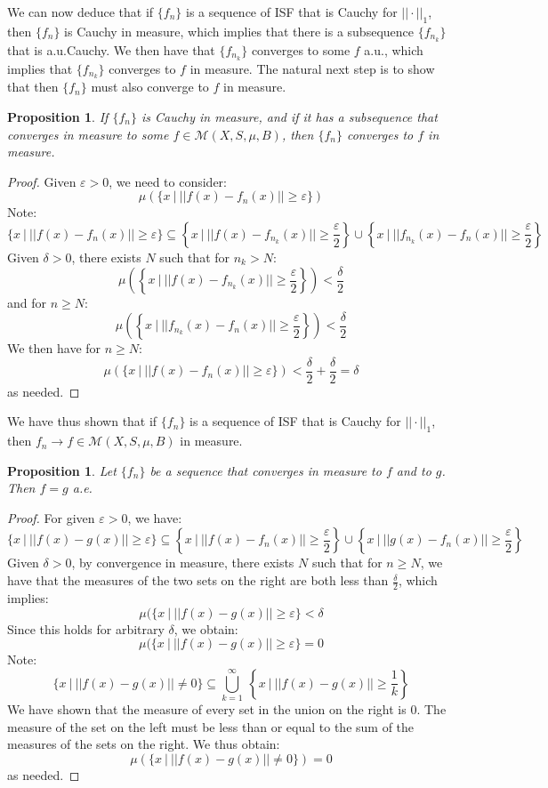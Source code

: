 \documentclass[a4paper,12pt]{report}
\newcommand{\ms}[1]{\mathscr{#1}}
\newcommand{\varep}{ \varepsilon }
\newcommand{\sse} {\subseteq}
\newtheorem{prop}[theorem]{Proposition}
\begin{document}
	\noindent We can now deduce that if $\{f_n\}$ is a sequence of ISF that is Cauchy for $||\cdot||_1$, then $\{f_n\}$ is Cauchy in measure, which implies that there is a subsequence $\{f_{n_k}\}$ that is a.u.Cauchy. We then have that $\{f_{n_k}\}$ converges to some $f$ a.u., which implies that $\{f_{n_k}\}$ converges to $f$ in measure. The natural next step is to show that then $\{f_n\}$ must also converge to $f$ in measure.
	
	\begin{prop}
	If $\{f_n\}$ is Cauchy in measure, and if it has a subsequence that converges in measure to some $f \in \ms{M}(X, S, \mu, B)$, then $\{f_n\}$ converges to $f$ in measure. 
	\end{prop}
	\begin{proof}
	Given $\varep > 0$, we need to consider:
	\[ \mu(\{x ~|~ ||f(x) - f_n(x)|| \geq \varep \}) \]
	Note:
	\[ \{x ~|~ ||f(x) - f_n(x)|| \geq \varep \} \sse \left \{x ~\big|~ ||f(x) - f_{n_k}(x)|| \geq \frac{\varep}{2} \right\} \cup \left\{ x ~\big|~ ||f_{n_k}(x) - f_n(x)|| \geq \frac{\varep}{2} \right\} \]
	Given $\delta > 0$, there exists $N$ such that for $n_k > N$:
	\[ \mu\left( \left\{ x ~\big|~ ||f(x) - f_{n_k}(x) || \geq \frac{\varep}{2} \right\} \right) < \frac{\delta}{2} \]	
	and for $n \geq N$:
	\[ \mu \left( \left\{ x ~\big|~ ||f_{n_k}(x) - f_n(x) || \geq \frac{\varep}{2} \right\} \right) < \frac{\delta}{2} \]
	We then have for $n \geq N$:
	\[ \mu(\{x ~|~ ||f(x) - f_n(x)|| \geq \varep \}) < \frac{\delta}{2} + \frac{\delta}{2} = \delta \]
	as needed. 
	\end{proof}
	
	\noindent We have thus shown that if $\{f_n\}$ is a sequence of ISF that is Cauchy for $||\cdot||_1$, then $f_n \rightarrow f \in \ms{M}(X, S, \mu, B)$ in measure. 
	
	\begin{prop}
	Let $\{f_n\}$ be a sequence that converges in measure to $f$ and to $g$. Then $f = g$ a.e.
	\end{prop}
	\begin{proof}
	For given $\varep > 0$, we have:
	\[ \{ x ~|~ ||f(x) - g(x)|| \geq \varep \} \sse \left \{ x ~\big|~ ||f(x) - f_n(x)|| \geq \frac{\varep}{2} \right\} \cup \left\{ x ~\big|~ ||g(x) - f_n(x)|| \geq \frac{\varep}{2} \right\} \]
	Given $\delta > 0$, by convergence in measure, there exists $N$ such that for $n \geq N$, we have that the measures of the two sets on the right are both less than $\frac{\delta}{2}$, which implies:
	\[ \mu(\{x ~|~ ||f(x) - g(x)|| \geq \varep\} < \delta \]
	Since this holds for arbitrary $\delta$, we obtain:
	\[ \mu(\{x ~|~ ||f(x) - g(x)|| \geq \varep\} = 0 \]
	Note:
	\[ \{ x ~|~ ||f(x) - g(x)|| \neq 0 \} \sse \bigcup_{k=1}^\infty ~ \left\{ x ~\big|~ ||f(x) - g(x)|| \geq \frac{1}{k} \right\} \]
	We have shown that the measure of every set in the union on the right is 0. The measure of the set on the left must be less than or equal to the sum of the measures of the sets on the right. We thus obtain:
	\[ \mu(\{x ~|~ ||f(x) - g(x)|| \neq 0 \}) = 0 \]
	as needed. 
	\end{proof}
	
\end{document}
